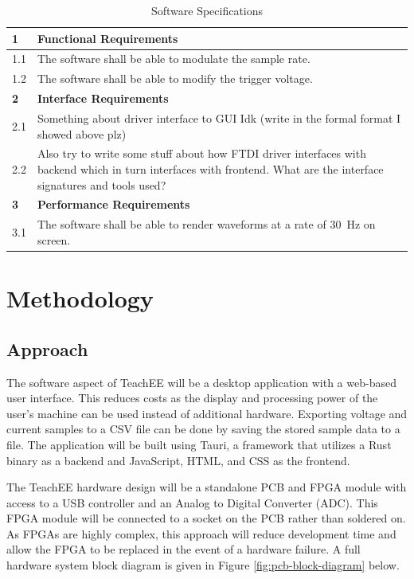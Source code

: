 \documentclass[letterpaper,12pt]{article}
\begin{document}
\begin{table}[h!]
    \caption{Software Specifications}
    \begin{tabularx}{\textwidth}{l|l}
        \textbf{1} & \textbf{Functional Requirements}\\
        \hline
        1.1 & The software shall be able to modulate the sample rate. \\
        1.2 & The software shall be able to modify the trigger voltage. \\
        \hline
        \textbf{2} & \textbf{Interface Requirements} \\
        \hline
        2.1 & Something about driver interface to GUI Idk (write in the formal format I showed above plz) \\
        2.2 & Also try to write some stuff about how FTDI driver interfaces with backend which in turn interfaces with frontend. What are the interface signatures and tools used? \\
        \hline
        \textbf{3} & \textbf{Performance Requirements} \\
        \hline
        3.1 & The software shall be able to render waveforms at a rate of \SI{30}{\hertz} on screen.
    \end{tabularx} 
\label{sw:specs-table}
\end{table}


\section{Methodology} %

\subsection{Approach}

The software aspect of TeachEE will be a desktop application
with a web-based user interface. This reduces costs as the display and
processing power of the user's machine can be used instead of additional
hardware. Exporting voltage and current samples to a CSV file can be done
by saving the stored sample data to a file. The application will be built using
Tauri, a framework that utilizes a Rust binary as a backend and JavaScript,
HTML, and CSS as the frontend.

The TeachEE hardware design will be a standalone PCB and FPGA module with
access to a USB controller and an Analog to Digital Converter (ADC). This FPGA
module will be connected to a socket on the PCB rather than soldered on. As
FPGAs are highly complex, this approach will reduce development time and allow
the FPGA to be replaced in the event of a hardware failure. A full hardware
system block diagram is given in Figure \ref{fig:pcb-block-diagram} below.
\end{document}
